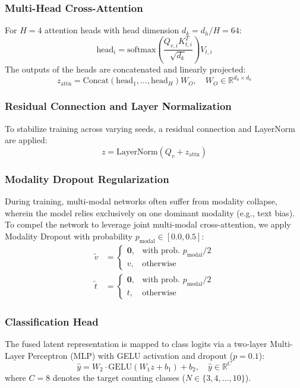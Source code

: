 \documentclass[conference]{IEEEtran}
\begin{document}
\subsubsection{Multi-Head Cross-Attention}
For $H=4$ attention heads with head dimension $d_k = d_h / H = 64$:
\begin{equation}
    \text{head}_i = \text{softmax}\left(\frac{Q_{v, i} K_{t, i}^T}{\sqrt{d_k}}\right) V_{t, i}
\end{equation}
The outputs of the heads are concatenated and linearly projected:
\begin{equation}
    z_{\text{attn}} = \text{Concat}(\text{head}_1, \dots, \text{head}_H) W_O, \quad W_O \in \mathbb{R}^{d_h \times d_h}
\end{equation}

\subsubsection{Residual Connection and Layer Normalization}
To stabilize training across varying seeds, a residual connection and LayerNorm are applied:
\begin{equation}
    z = \text{LayerNorm}(Q_v + z_{\text{attn}})
\end{equation}

\subsubsection{Modality Dropout Regularization}
During training, multi-modal networks often suffer from modality collapse, wherein the model relies exclusively on one dominant modality (e.g., text bias). To compel the network to leverage joint multi-modal cross-attention, we apply Modality Dropout with probability $p_{\text{modal}} \in [0.0, 0.5]$:
\begin{align}
    \tilde{v} &= 
    \begin{cases} 
    \mathbf{0}, & \text{with prob. } p_{\text{modal}} / 2 \\
    v, & \text{otherwise}
    \end{cases} \\
    \tilde{t} &= 
    \begin{cases} 
    \mathbf{0}, & \text{with prob. } p_{\text{modal}} / 2 \\
    t, & \text{otherwise}
    \end{cases}
\end{align}

\subsubsection{Classification Head}
The fused latent representation is mapped to class logits via a two-layer Multi-Layer Perceptron (MLP) with GELU activation and dropout ($p=0.1$):
\begin{equation}
    \hat{y} = W_2 \cdot \text{GELU}(W_1 z + b_1) + b_2, \quad \hat{y} \in \mathbb{R}^C
\end{equation}
where $C=8$ denotes the target counting classes ($N \in \{3, 4, \dots, 10\}$).
\end{document}

